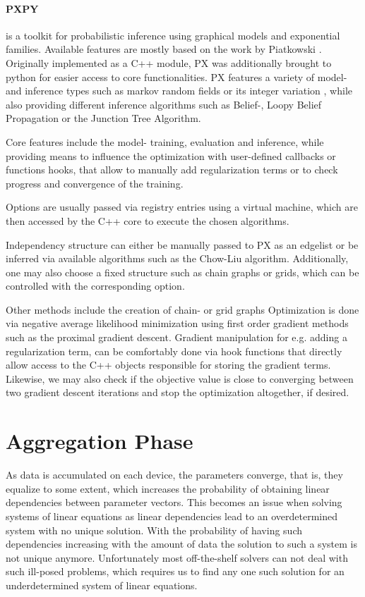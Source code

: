 \paragraph*{PXPY}
is a toolkit for probabilistic inference using graphical models and exponential families.
Available features are mostly based on the work by Piatkowski \cite{piatkowski2018exponential}.
Originally implemented as a C++ module, PX was additionally brought to python for easier access to core functionalities.
PX features a variety of model- and inference types such as markov random fields or its integer variation , while also providing different inference algorithms such as Belief-, Loopy Belief Propagation or the Junction Tree Algorithm.

Core features include the model- training, evaluation and inference, while providing means to influence the optimization with user-defined callbacks or functions hooks, that allow to manually add regularization terms or to check progress and convergence of the training.

Options are usually passed via registry entries using a virtual machine, which are then accessed by the C++ core to execute the chosen algorithms.

Independency structure can either be manually passed to PX as an edgelist or be inferred via available algorithms such as the Chow-Liu algorithm. 
Additionally, one may also choose a fixed structure such as chain graphs or grids, which can be controlled with the corresponding option.

Other methods include the creation of chain- or grid graphs 
Optimization is done via negative average likelihood minimization using first order gradient methods such as the proximal gradient descent.
Gradient manipulation for e.g. adding a regularization term, can be comfortably done via hook functions that directly allow access to the C++ objects responsible for storing the gradient terms.
Likewise, we may also check if the objective value is close to converging between two gradient descent iterations and stop the optimization altogether, if desired.



\section{Aggregation Phase}
As data is accumulated on each device, the parameters converge, that is, they equalize to some extent, which increases the probability of obtaining linear dependencies between parameter vectors. 
This becomes an issue when solving systems of linear equations as linear dependencies lead to an overdetermined system with no unique solution.
With the probability of having such dependencies increasing with the amount of data the solution to such a system is not unique anymore.
Unfortunately most off-the-shelf solvers can not deal with such ill-posed problems, which requires us to find any one such solution for an underdetermined system of linear equations.

